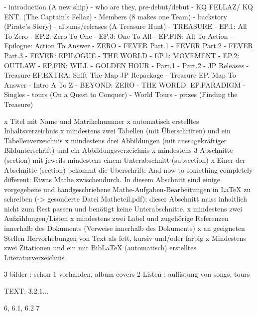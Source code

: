 - introduction (A new ship)
    - who are they, pre-debut/debut
- KQ FELLAZ/ KQ ENT. (The Captain's Fellaz)
- Members (8 makes one Team)
- backstory (Pirate's Story)
- albums/releases (A Treasure Hunt)
    - TREASURE
        - EP.1: All To Zero
        - EP.2: Zero To One
        - EP.3: One To All
        - EP.FIN: All To Action
        - Epilogue: Action To Answer
    - ZERO
        - FEVER Part.1
        - FEVER Part.2
        - FEVER Part.3
        - FEVER: EPILOGUE
    - THE WORLD
        - EP.1: MOVEMENT
        - EP.2: OUTLAW
        - EP.FIN: WILL
    - GOLDEN HOUR
        - Part.1
        - Part.2
    - JP Releases
        - Treasure EP.EXTRA: Shift The Map JP Repackage
        - Treasure EP. Map To Answer
        - Intro A To Z
        - BEYOND: ZERO
        - THE WORLD: EP.PARADIGM
    - Singles
- tours (On a Quest to Conquer)
    - World Tours
- prizes (Finding the Treasure)




x Titel mit Name und Matrikelnummer
x automatisch erstelltes Inhaltsverzeichnis
x mindestens zwei Tabellen (mit Überschriften) und ein Tabellenverzeichnis
x mindestens drei Abbildungen (mit aussagekräftiger Bildunterschrift) und ein Abbildungsverzeichnis
x mindestens 3 Abschnitte (section) mit jeweils mindestens einem Unterabschnitt (subsection)
x Einer der Abschnitte (section) bekommt die Überschrift: And now to something completely different: Etwas Mathe zwischendurch. In diesem Abschnitt sind einige vorgegebene und handgeschriebene Mathe-Aufgaben-Bearbeitungen in LaTeX zu schreiben (-> gesonderte Datei Matheteil.pdf); dieser Abschnitt muss inhaltlich nicht zum Rest passen und benötigt keine Unterabschnitte.
x mindestens zwei Aufzählungen/Listen
x mindestens zwei Label und zugehörige Referenzen innerhalb des Dokuments (Verweise innerhalb des Dokuments)
x an geeigneten Stellen Hervorhebungen von Text als fett, kursiv und/oder farbig
x Mindestens zwei Zitationen und ein mit BibLaTeX (automatisch) erstelltes Literaturverzeichnis


3 bilder 					: schon 1 vorhanden, album covers
2 Listen 					: auflistung von songs, tours

TEXT:
3.2.1...

6, 6.1, 6.2
7